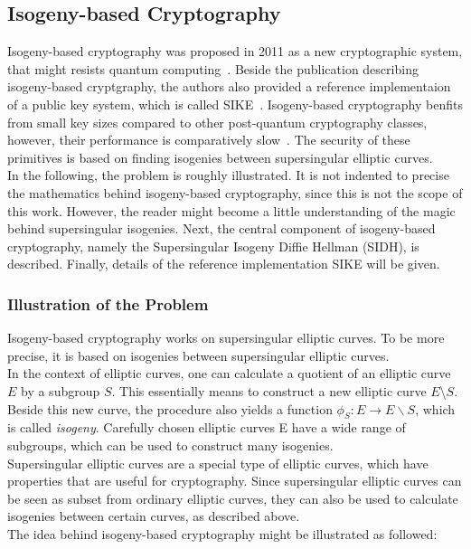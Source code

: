 \subsection{Isogeny-based Cryptography} \label{sec:isogeny-based_crypto}
Isogeny-based cryptography was proposed in 2011 as a new cryptographic system, that might resists quantum computing~\parencite{jao2011towards}. Beside the publication describing isogeny-based cryptgraphy, the authors also provided a reference implementaion of a public key system, which is called SIKE~\parencite{sike2020spec}. Isogeny-based cryptography benfits from small key sizes compared to other post-quantum cryptography classes, however, their performance is comparatively slow~\parencite{sike2020spec}. The security of these primitives is based on finding isogenies between supersingular elliptic curves.\\
In the following, the problem is roughly illustrated. It is not indented to precise the mathematics behind isogeny-based cryptography, since this is not the scope of this work. However, the reader might become a little understanding of the magic behind supersingular isogenies. Next, the central component of isogeny-based cryptography, namely the Supersingular Isogeny Diffie Hellman (SIDH), is described. Finally, details of the reference implementation SIKE will be given.

\subsubsection{Illustration of the Problem ~\parencite{urbanik2017friendly}~\parencite{costello2019supersingular}}
Isogeny-based cryptography works on supersingular elliptic curves. To be more precise, it is based on isogenies between supersingular elliptic curves.
\\
In the context of elliptic curves, one can calculate a quotient of an elliptic curve $E$ by a subgroup $S$. This essentially means to construct a new elliptic curve $E$\textbackslash $S$.
Beside this new curve, the procedure also yields a function $\phi_S: E \to E \backslash S$, which is called \textit{isogeny}. Carefully chosen elliptic curves E have a wide range of subgroups, which can be used to construct many isogenies.
\\
Supersingular elliptic curves are a special type of elliptic curves, which have properties that are useful for cryptography. Since supersingular elliptic curves can be seen as subset from ordinary elliptic curves, they can also be used to calculate isogenies between certain curves, as described above.
\\
The idea behind isogeny-based cryptography might be illustrated as followed:

